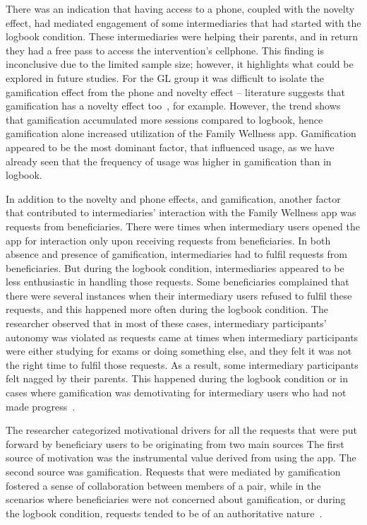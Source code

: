 There was an indication that having access to a phone, coupled with the novelty effect, had mediated engagement of some intermediaries that had started with the logbook condition. These intermediaries were helping their parents, and in return they had a free pass to access the intervention's cellphone. This finding is inconclusive due to the limited sample size; however, it highlights what could be explored in future studies. For the GL group it was difficult to isolate the gamification effect from the phone and novelty effect -- literature suggests that gamification has a novelty effect too~\citep{koivisto2014demographic}, for example. However, the trend shows that gamification accumulated more sessions compared to logbook, hence gamification alone increased utilization of the Family Wellness app. Gamification appeared to be the most dominant factor, that influenced usage, as we have already seen that the frequency of usage was higher in gamification than in logbook.

In addition to the novelty and phone effects, and gamification, another factor that contributed to intermediaries' interaction with the Family Wellness app was requests from beneficiaries. There were times when intermediary users opened the app for interaction only upon receiving requests from beneficiaries. In both absence and presence of gamification, intermediaries had to fulfil requests from beneficiaries.  But during the logbook condition, intermediaries appeared to be less enthusiastic in handling those requests. Some beneficiaries complained that there were several instances when their intermediary users refused to fulfil these requests, and this happened more often during the logbook condition. The researcher observed that in most of these cases, intermediary participants' autonomy was violated as requests came at times when intermediary participants were either studying for exams or doing something else, and they felt it was not the right time to fulfil those requests. As a result, some intermediary participants felt nagged by their parents. This happened during the logbook condition or in cases where gamification was demotivating for intermediary users who had not made progress~\citep{katule2016family}.

The researcher categorized motivational drivers for all the requests that were put forward by beneficiary users to be originating from two main sources The first source of motivation was the instrumental value derived from using the app. The second source was gamification. Requests that were mediated by gamification fostered a sense of collaboration between members of a pair, while in the scenarios where beneficiaries were not concerned about gamification, or during the logbook condition, requests tended to be of an authoritative nature~\citep{katule2016family}. %

